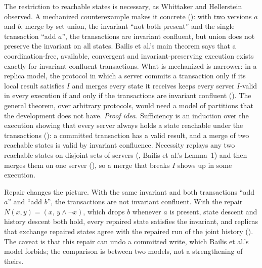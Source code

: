 The restriction to reachable states is necessary, as Whittaker and
Hellerstein~\cite{whittaker2018} observed. A mechanized counterexample makes it concrete
(): with two versions $a$ and $b$, merge by set union, the invariant ``not both
present'' and the single transaction ``add $a$'', the transactions are invariant confluent, but
union does not preserve the invariant on all states. Bailis et al.'s main theorem says that a
coordination-free, available, convergent and invariant-preserving execution exists exactly for
invariant-confluent transactions. What is mechanized is narrower: in a replica model,
the protocol in which a server commits a transaction only if its local result satisfies $I$ and merges every state it receives keeps every server $I$-valid in every execution if and only if the transactions are invariant confluent (). The general theorem, over arbitrary protocols, would need a model of
partitions that the development does not have.
\emph{Proof idea.} Sufficiency is an induction over the execution showing that every server always
holds a state reachable under the transactions (): a committed transaction has a valid
result, and a merge of two reachable states is valid by invariant confluence. Necessity replays any
two reachable states on disjoint sets of servers (, Bailis et al.'s Lemma~1) and then
merges them on one server (), so a merge that breaks $I$ shows up in some execution.

Repair changes the picture. With the same invariant and both transactions ``add $a$'' and ``add
$b$'', the transactions are not invariant confluent. With the repair
$N(x, y) = (x,\, y \wedge \neg x)$, which drops $b$ whenever $a$ is present, state descent and
history descent both hold, every repaired state satisfies the invariant, and replicas that exchange
repaired states agree with the repaired run of the joint history (). The caveat
is that this repair can undo a committed write, which Bailis et al.'s model forbids; the comparison is
between two models, not a strengthening of theirs.
